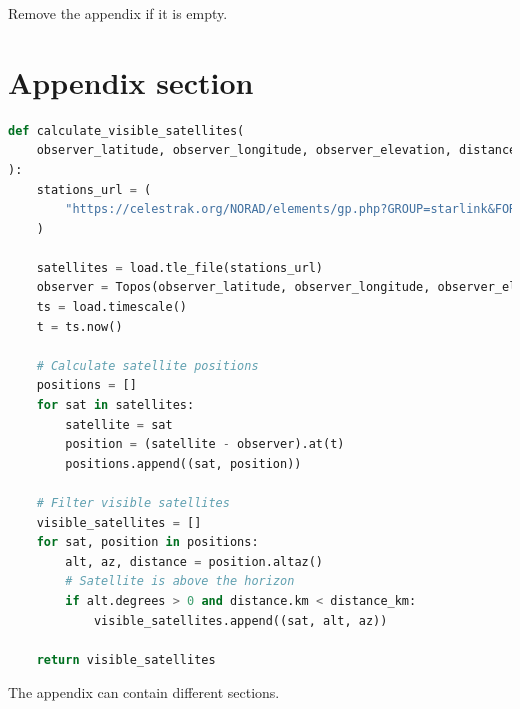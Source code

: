\documentclass[IN,11pt,twoside,openright,bachelor,english]{tumthesis}
\begin{document}
Remove the appendix if it is empty.

\section{Appendix section}

\begin{lstlisting}[language=python,caption={the \texttt{calculate\_visible\_satellites} function},captionpos=b]
def calculate_visible_satellites(
    observer_latitude, observer_longitude, observer_elevation, distance_km
):
    stations_url = (
        "https://celestrak.org/NORAD/elements/gp.php?GROUP=starlink&FORMAT=tle"
    )

    satellites = load.tle_file(stations_url)
    observer = Topos(observer_latitude, observer_longitude, observer_elevation)
    ts = load.timescale()
    t = ts.now()

    # Calculate satellite positions
    positions = []
    for sat in satellites:
        satellite = sat
        position = (satellite - observer).at(t)
        positions.append((sat, position))

    # Filter visible satellites
    visible_satellites = []
    for sat, position in positions:
        alt, az, distance = position.altaz()
        # Satellite is above the horizon
        if alt.degrees > 0 and distance.km < distance_km:
            visible_satellites.append((sat, alt, az))

    return visible_satellites
\end{lstlisting}

The appendix can contain different sections.

\clearpage
\pagestyle{thesischapter}

\cleardoublepage
{}
\printbibliography[heading=bibintoc]

\clearpage
\pagestyle{empty}
\end{document}
